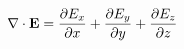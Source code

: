 \documentclass[preview]{standalone}
\begin{document}
\begin{align*}
\special{dvisvgm:raw <g id='unique000'>}\nabla\cdot\mathbf E=\frac{\partial E_x}{\partial x}+\frac{\partial E_y}{\partial y}+\frac{\partial E_z}{\partial z}\special{dvisvgm:raw </g>}
\end{align*}
\end{document}
